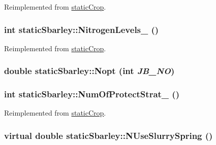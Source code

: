 Reimplemented from \hyperlink{classstatic_crop_af3aa85321a8a75406f8a0751b71587d0}{staticCrop}.\hypertarget{classstatic_sbarley_acc37bda353d9d226c71e088d237c7bc7}{
\subsubsection[{NitrogenLevels\_\-}]{\setlength{\rightskip}{0pt plus 5cm}int staticSbarley::NitrogenLevels\_\- ()}}
\label{classstatic_sbarley_acc37bda353d9d226c71e088d237c7bc7}


Reimplemented from \hyperlink{classstatic_crop_a32b69ed138beaed150efa74d18e82d8e}{staticCrop}.\hypertarget{classstatic_sbarley_ac550edbfef10d54849187db782f641d4}{
\subsubsection[{Nopt}]{\setlength{\rightskip}{0pt plus 5cm}double staticSbarley::Nopt (int {\em JB\_\-NO})}}
\label{classstatic_sbarley_ac550edbfef10d54849187db782f641d4}
\hypertarget{classstatic_sbarley_a905a55ee29cf26d04bd127f4bb683a5a}{
\subsubsection[{NumOfProtectStrat\_\-}]{\setlength{\rightskip}{0pt plus 5cm}int staticSbarley::NumOfProtectStrat\_\- ()}}
\label{classstatic_sbarley_a905a55ee29cf26d04bd127f4bb683a5a}


Reimplemented from \hyperlink{classstatic_crop_a4d3d767f569f48eb68ffa76822302467}{staticCrop}.\hypertarget{classstatic_sbarley_aefb0e706003fefdaab30b1c25d56191b}{
\subsubsection[{NUseSlurrySpring}]{\setlength{\rightskip}{0pt plus 5cm}virtual double staticSbarley::NUseSlurrySpring ()}}
\label{classstatic_sbarley_aefb0e706003fefdaab30b1c25d56191b}


